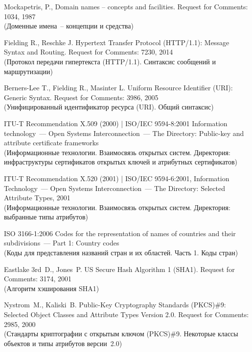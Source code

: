 \clearpage
\renewcommand{\bibname}{Библиография}
\begin{thebibliography}{9}

Mockapetris, P., Domain names -- concepts and facilities. 
Request for Comments: 1034, 1987\\ 
{\small (Доменные имена~-- концепции и средства)} 

Fielding R., Reschke J.
Hypertext Transfer Protocol (HTTP/1.1): Message Syntax and Routing. 
Request for Comments: 7230, 2014\\ 
{\small (Протокол передачи гипертекста (HTTP/1.1). Синтаксис сообщений и 
маршрутизации)}

Berners-Lee T., Fielding R., Masinter L. 
Uniform Resource Identifier (URI): Generic Syntax.  
Request for Comments: 3986, 2005\\
{\small (Унифицированный идентификатор ресурса (URI). Общий синтаксис)}

ITU-T Recommendation X.509 (2000) | ISO/IEC 9594-8:2001
Information technology~--- Open Systems Interconnection~--- 
The Directory: Public-key and attribute certificate frameworks\\
{\small (Информационные технологии. Взаимосвязь открытых систем.
Директория: инфраструктуры сертификатов открытых ключей и атрибутных 
сертификатов)} 

ITU-T Recommendation X.520 (2001) | ISO/IEC 9594-6:2001,
Information Technology~--- Open Systems Interconnection~---
The Directory: Selected Attribute Types, 2001\\
{\small (Информационные технологии. Взаимосвязь открытых систем.
Директория: выбранные типы атрибутов)}

ISO 3166-1:2006 Codes for the representation of names of countries and 
their subdivisions~--- Part 1: Country codes\\
{\small (Коды для представления названий стран и их областей. Часть 1. 
Коды стран)} 

Eastlake 3rd~D., Jones~P.
US Secure Hash Algorithm 1 (SHA1). 
Request for Comments: 3174, 2001\\   
{\small (Алгоритм хэширования SHA1)}

Nystrom~M., Kaliski~B. 
Public-Key Cryptography Standards (PKCS)\#9: 
Selected Object Classes and Attribute Types Version 2.0. Request for 
Comments: 2985, 2000\\ 
{\small (Стандарты криптографии с открытым ключом (PKCS)\#9. 
Некоторые классы объектов и типы атрибутов версии~2.0)}  


\end{thebibliography}
